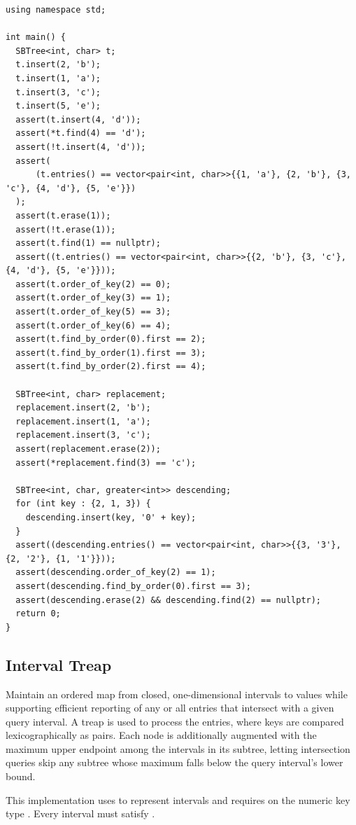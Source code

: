 \begin{lstlisting}[style=cpp]
using namespace std;

int main() {
  SBTree<int, char> t;
  t.insert(2, 'b');
  t.insert(1, 'a');
  t.insert(3, 'c');
  t.insert(5, 'e');
  assert(t.insert(4, 'd'));
  assert(*t.find(4) == 'd');
  assert(!t.insert(4, 'd'));
  assert(
      (t.entries() == vector<pair<int, char>>{{1, 'a'}, {2, 'b'}, {3, 'c'}, {4, 'd'}, {5, 'e'}})
  );
  assert(t.erase(1));
  assert(!t.erase(1));
  assert(t.find(1) == nullptr);
  assert((t.entries() == vector<pair<int, char>>{{2, 'b'}, {3, 'c'}, {4, 'd'}, {5, 'e'}}));
  assert(t.order_of_key(2) == 0);
  assert(t.order_of_key(3) == 1);
  assert(t.order_of_key(5) == 3);
  assert(t.order_of_key(6) == 4);
  assert(t.find_by_order(0).first == 2);
  assert(t.find_by_order(1).first == 3);
  assert(t.find_by_order(2).first == 4);

  SBTree<int, char> replacement;
  replacement.insert(2, 'b');
  replacement.insert(1, 'a');
  replacement.insert(3, 'c');
  assert(replacement.erase(2));
  assert(*replacement.find(3) == 'c');

  SBTree<int, char, greater<int>> descending;
  for (int key : {2, 1, 3}) {
    descending.insert(key, '0' + key);
  }
  assert((descending.entries() == vector<pair<int, char>>{{3, '3'}, {2, '2'}, {1, '1'}}));
  assert(descending.order_of_key(2) == 1);
  assert(descending.find_by_order(0).first == 3);
  assert(descending.erase(2) && descending.find(2) == nullptr);
  return 0;
}
\end{lstlisting}
\subsection{Interval Treap}
\label{sec:2.4.6}
Maintain an ordered map from closed, one-dimensional intervals to values while supporting efficient reporting of any or all entries that intersect with a given query interval. A treap is used to process the entries, where keys are compared lexicographically as pairs. Each node is additionally augmented with the maximum upper endpoint among the intervals in its subtree, letting intersection queries skip any subtree whose maximum falls below the query interval's lower bound.

This implementation uses  to represent intervals and requires  on the numeric key type . Every interval must satisfy .

